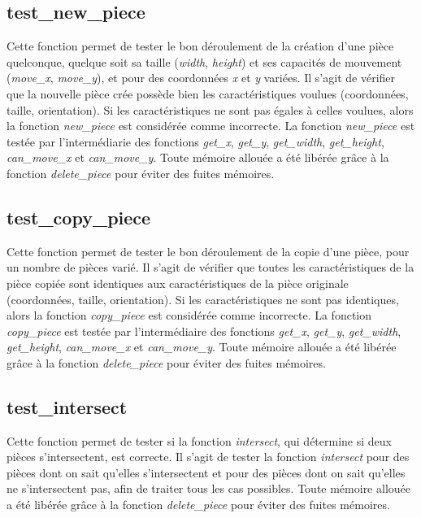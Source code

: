 \documentclass{report}
\begin{document}
\subsection{test\_new\_piece}
Cette fonction permet de tester le bon déroulement de la création d'une pièce quelconque, quelque soit sa taille (\emph{width}, \emph{height}) et ses capacités de mouvement (\emph{move\_x}, \emph{move\_y}), et pour des coordonnées \emph{x} et \emph{y} variées. Il s'agit de vérifier que la nouvelle pièce crée possède bien les caractéristiques voulues (coordonnées, taille, orientation). Si les caractéristiques ne sont pas égales à celles voulues, alors la fonction \emph{new\_piece} est considérée comme incorrecte. La fonction \emph{new\_piece} est testée par l'intermédiarie des fonctions \emph{get\_x}, \emph{get\_y}, \emph{get\_width}, \emph{get\_height}, \emph{can\_move\_x} et \emph{can\_move\_y}. Toute mémoire allouée a été libérée grâce à la fonction \emph{delete\_piece} pour éviter des fuites mémoires.
\subsection{test\_copy\_piece}
Cette fonction permet de tester le bon déroulement de la copie d'une pièce, pour un nombre de pièces varié. Il s'agit de vérifier que toutes les caractéristiques de la pièce copiée sont identiques aux caractéristiques de la pièce originale (coordonnées, taille, orientation). Si les caractéristiques ne sont pas identiques, alors la fonction \emph{copy\_piece} est considérée comme incorrecte. La fonction \emph{copy\_piece} est testée par l'intermédiaire des fonctions \emph{get\_x}, \emph{get\_y}, \emph{get\_width}, \emph{get\_height}, \emph{can\_move\_x} et \emph{can\_move\_y}. Toute mémoire allouée a été libérée grâce à la fonction \emph{delete\_piece} pour éviter des fuites mémoires.
\subsection{test\_intersect}
Cette fonction permet de tester si la fonction \emph{intersect}, qui détermine si deux pièces s'intersectent, est correcte. Il s'agit de tester la fonction \emph{intersect} pour des pièces dont on sait qu'elles s'intersectent et pour des pièces dont on sait qu'elles ne s'intersectent pas, afin de traiter tous les cas possibles. Toute mémoire allouée a été libérée grâce à la fonction \emph{delete\_piece} pour éviter des fuites mémoires.
\end{document}
